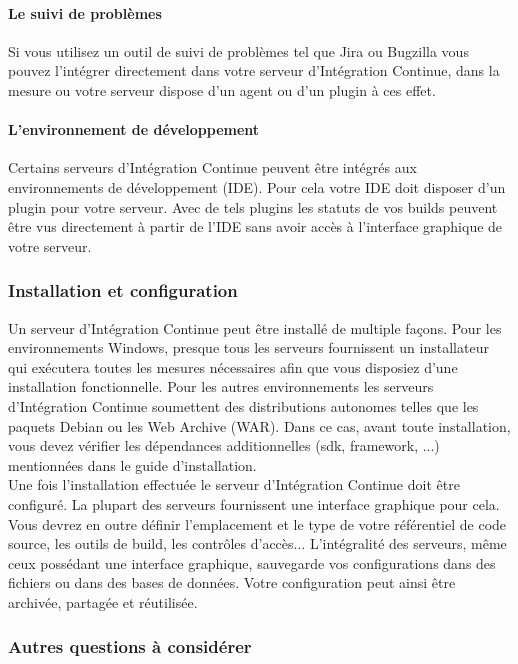       \paragraph{Le suivi de problèmes} Si vous utilisez un outil de suivi de problèmes tel que Jira ou Bugzilla vous pouvez l'intégrer directement dans votre serveur d'Intégration Continue, dans la mesure ou votre serveur dispose d'un agent ou d'un plugin à ces effet.
      \paragraph{L'environnement de développement} Certains serveurs d'Intégration Continue peuvent être intégrés aux environnements de développement (IDE). Pour cela votre IDE doit disposer d'un plugin pour votre serveur. Avec de tels plugins les statuts de vos builds peuvent être vus directement à partir de l'IDE sans avoir accès à l'interface graphique de votre serveur.

      \subsubsection{Installation et configuration}
      Un serveur d'Intégration Continue peut être installé de multiple façons. Pour les environnements Windows, presque tous les serveurs fournissent un installateur qui exécutera toutes les mesures nécessaires afin que vous disposiez d'une installation fonctionnelle. Pour les autres environnements les serveurs d'Intégration Continue soumettent des distributions autonomes telles que les paquets Debian ou les Web Archive (WAR). Dans ce cas, avant toute installation, vous devez vérifier les dépendances additionnelles (sdk, framework, ...) mentionnées dans le guide d'installation.\\

      Une fois l'installation effectuée le serveur d'Intégration Continue doit être configuré. La plupart des serveurs fournissent une interface graphique pour cela. Vous devrez en outre définir l'emplacement et le type de votre référentiel de code source, les outils de build, les contrôles d'accès... L'intégralité des serveurs, même ceux possédant une interface graphique, sauvegarde vos configurations dans des fichiers ou dans des bases de données. Votre configuration peut ainsi être archivée, partagée et réutilisée.

      \subsubsection{Autres questions à considérer}

